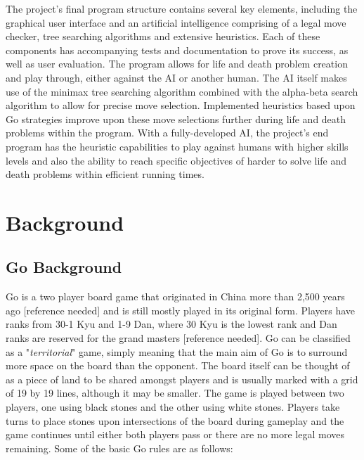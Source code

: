\documentclass{l3proj}
\begin{document}
The project's final program structure contains several key elements, including the graphical user interface and an artificial intelligence comprising of a legal move checker, tree searching algorithms and extensive heuristics. Each of these components has accompanying tests and documentation to prove its success, as well as user evaluation. The program allows for life and death problem creation and play through, either against the AI or another human. The AI itself makes use of the minimax tree searching algorithm combined with the alpha-beta search algorithm to allow for precise move selection. Implemented heuristics based upon Go strategies improve upon these move selections further during life and death problems within the program. With a fully-developed AI, the project's end program has the heuristic capabilities to play against humans with higher skills levels and also the ability to reach specific objectives of harder to solve life and death problems within efficient running times.

\chapter{Background}
\label{background}

\section{Go Background}

Go is a two player board game that originated in China more than 2,500 years ago [reference needed] and is still mostly played in its original form.  Players have ranks from 30-1 Kyu and 1-9 Dan, where 30 Kyu is the lowest rank and Dan ranks are reserved for the grand masters [reference needed]. Go can be classified as a "\textit{territorial}" game, simply meaning that the main aim of Go is to surround more space on the board than the opponent. The board itself can be thought of as a piece of land to be shared amongst players and is usually marked with a grid of 19 by 19 lines, although it may be smaller. The game is played between two players, one using black stones and the other using white stones. Players take turns to place stones upon intersections of the board during gameplay and the game continues until either both players pass or there are no more legal moves remaining.  Some of the basic Go rules are as follows:
\end{document}
